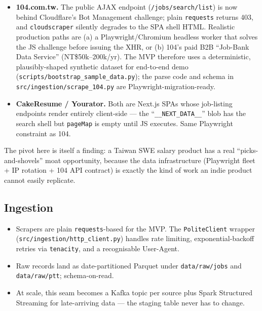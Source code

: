 \documentclass[11pt,a4paper]{article}
\begin{document}
\begin{itemize}[leftmargin=*,itemsep=0.1em,topsep=0.2em]
  \item \textbf{104.com.tw.} The public AJAX endpoint
    (\texttt{/jobs/search/list}) is now behind Cloudflare's Bot
    Management challenge; plain \texttt{requests} returns 403, and
    \texttt{cloudscraper} silently degrades to the SPA shell HTML.
    Realistic production paths are (a) a Playwright/Chromium headless
    worker that solves the JS challenge before issuing the XHR, or
    (b) 104's paid B2B ``Job-Bank Data Service'' (NT\$50k--200k/yr).
    The MVP therefore uses a deterministic, plausibly-shaped
    synthetic dataset for end-to-end demo
    (\texttt{scripts/bootstrap\_sample\_data.py}); the parse code and
    schema in \texttt{src/ingestion/scrape\_104.py} are
    Playwright-migration-ready.
  \item \textbf{CakeResume / Yourator.} Both are Next.js SPAs whose
    job-listing endpoints render entirely client-side --- the
    ``\texttt{\_\_NEXT\_DATA\_\_}'' blob has the search shell but
    \texttt{pageMap} is empty until JS executes. Same Playwright
    constraint as 104.
\end{itemize}

The pivot here is itself a finding: a Taiwan SWE salary product has a
real ``picks-and-shovels'' moat opportunity, because the data
infrastructure (Playwright fleet + IP rotation + 104 API contract) is
exactly the kind of work an indie product cannot easily replicate.

\subsection{Ingestion}
\begin{itemize}[leftmargin=*,itemsep=0.1em,topsep=0.2em]
  \item Scrapers are plain \texttt{requests}-based for the MVP. The
    \texttt{PoliteClient} wrapper (\texttt{src/ingestion/http\_client.py})
    handles rate limiting, exponential-backoff retries via
    \texttt{tenacity}, and a recognisable User-Agent.
  \item Raw records land as date-partitioned Parquet under
    \texttt{data/raw/jobs} and \texttt{data/raw/ptt}; schema-on-read.
  \item At scale, this seam becomes a Kafka topic per source plus Spark
    Structured Streaming for late-arriving data --- the staging table
    never has to change.
\end{itemize}
\end{document}
